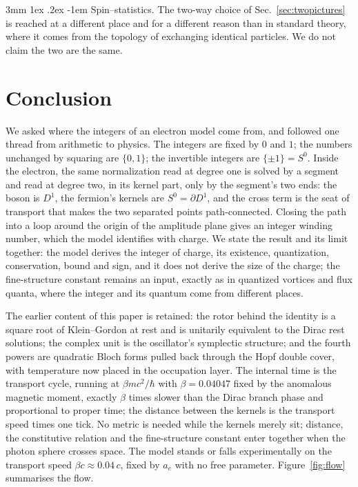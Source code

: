 \documentclass[%
 reprint, amsmath,amssymb, aps, prb, ]{revtex4-2}
\makeatletter
\numberwithin{equation}{section}
\renewcommand\paragraph{%
  \@startsection{paragraph}{4}{\z@}%
    {3mm \@plus 1ex \@minus .2ex}%
    {-1em}%
    {\normalfont\normalsize\itshape}}
\makeatother
\begin{document}
\paragraph{Spin--statistics.} The two-way choice of Sec.~\ref{sec:twopictures} is reached at a different place and for a different reason than in standard theory, where it comes from the topology of exchanging identical particles. We do not claim the two are the same.

\section{Conclusion}
\label{sec:conclusion}

We asked where the integers of an electron model come from, and followed one thread from arithmetic to physics. The integers are fixed by $0$ and $1$; the numbers unchanged by squaring are $\{0,1\}$; the invertible integers are $\{\pm1\}=S^0$. Inside the electron, the same normalization read at degree one is solved by a segment and read at degree two, in its kernel part, only by the segment's two ends: the boson is $D^1$, the fermion's kernels are $S^0=\partial D^1$, and the cross term is the seat of transport that makes the two separated points path-connected. Closing the path into a loop around the origin of the amplitude plane gives an integer winding number, which the model identifies with charge. We state the result and its limit together: the model derives the integer of charge, its existence, quantization, conservation, bound and sign, and it does not derive the size of the charge; the fine-structure constant remains an input, exactly as in quantized vortices and flux quanta, where the integer and its quantum come from different places.

The earlier content of this paper is retained: the rotor behind the identity is a square root of Klein--Gordon at rest and is unitarily equivalent to the Dirac rest solutions; the complex unit is the oscillator's symplectic structure; and the fourth powers are quadratic Bloch forms pulled back through the Hopf double cover, with temperature now placed in the occupation layer. The internal time is the transport cycle, running at $\beta mc^2/\hbar$ with $\beta=0.04047$ fixed by the anomalous magnetic moment, exactly $\beta$ times slower than the Dirac branch phase and proportional to proper time; the distance between the kernels is the transport speed times one tick. No metric is needed while the kernels merely sit; distance, the constitutive relation and the fine-structure constant enter together when the photon sphere crosses space. The model stands or falls experimentally on the transport speed $\beta c\approx0.04\,c$, fixed by $a_e$ with no free parameter. Figure~\ref{fig:flow} summarises the flow.
\end{document}
